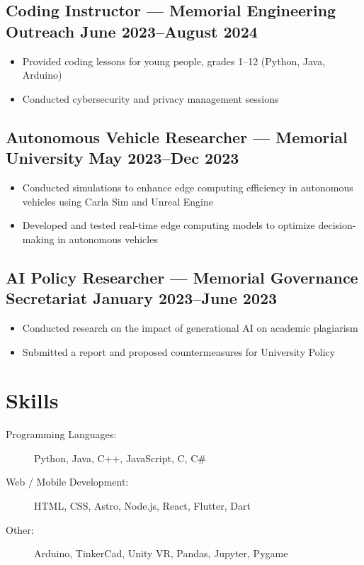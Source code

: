 \documentclass[10pt]{article}
\begin{document}
\subsection{Coding Instructor — Memorial Engineering Outreach \hfill June 2023–August 2024}
\begin{itemize}
    \item Provided coding lessons for young people, grades 1–12 (Python, Java, Arduino)
    \item Conducted cybersecurity and privacy management sessions
\end{itemize}

\subsection{Autonomous Vehicle Researcher — Memorial University \hfill May 2023–Dec 2023}
\begin{itemize}
    \item Conducted simulations to enhance edge computing efficiency in autonomous vehicles using Carla Sim and Unreal Engine
    \item Developed and tested real-time edge computing models to optimize decision-making in autonomous vehicles
\end{itemize}

\subsection{AI Policy Researcher — Memorial Governance Secretariat \hfill January 2023–June 2023}
\begin{itemize}
    \item Conducted research on the impact of generational AI on academic plagiarism
    \item Submitted a report and proposed countermeasures for University Policy
\end{itemize}

\section{Skills}
\begin{description}
    \item[Programming Languages:] Python, Java, C++, JavaScript, C, C\#
    \item[Web / Mobile Development:] HTML, CSS, Astro, Node.js, React, Flutter, Dart
    \item[Other:] Arduino, TinkerCad, Unity VR, Pandas, Jupyter, Pygame
\end{description}
\end{document}

